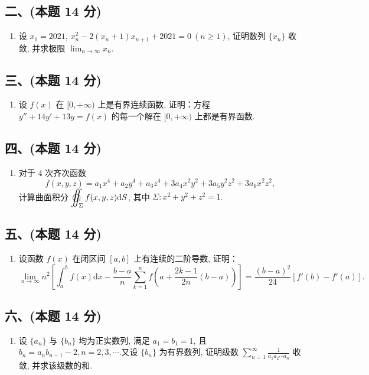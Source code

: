 \subsection*{二、(本题 14 分)}
\begin{enumerate}[start=6]
    \item 设 $x_1 = 2021$, $x_n^2 - 2(x_n + 1)x_{n+1} + 2021 = 0 \ (n \geq 1)$, 证明数列 $\{x_n\}$ 收敛, 并求极限 $ \displaystyle\lim_{n \to \infty} x_n $.
\end{enumerate}

\subsection*{三、(本题 14 分)}
\begin{enumerate}[start=7]
    \item 设 $f(x)$ 在 $[0, +\infty)$ 上是有界连续函数, 证明：方程 $y'' + 14y' + 13y = f(x)$ 的每一个解在 $[0, +\infty)$ 上都是有界函数.
\end{enumerate}

\subsection*{四、(本题 14 分)}
\begin{enumerate}[start=8]
    \item 对于 4 次齐次函数
          \[ f(x, y, z) = a_1x^4 + a_2y^4 + a_3z^4 + 3a_4x^2y^2 + 3a_5y^2z^2 + 3a_6x^2z^2,  \]
          计算曲面积分 $ \displaystyle\varoiint_{\Sigma} f(x, y, z) \mathrm{d}S $, 其中 $\Sigma : x^2 + y^2 + z^2 = 1$.
\end{enumerate}

\subsection*{五、(本题 14 分)}
\begin{enumerate}[start=9]
    \item 设函数 $f(x)$ 在闭区间 $[a, b]$ 上有连续的二阶导数, 证明：
          \[ \lim_{n \to \infty} n^2 \left[ \int_a^b f(x) \mathrm{d}x - \frac{b-a}{n} \sum_{k=1}^n f\left( a + \frac{2k-1}{2n}(b-a) \right) \right] = \frac{(b-a)^2}{24} [f'(b) - f'(a)] .\]
\end{enumerate}

\subsection*{六、(本题 14 分)}
\begin{enumerate}[start=10]
    \item 设 $\{a_n\}$ 与 $\{b_n\}$ 均为正实数列, 满足 $a_1 = b_1 = 1$, 且 $b_n = a_n b_{n-1} - 2,  n = 2,  3,  \cdots$.又设 $\{b_n\}$ 为有界数列, 证明级数 $ \displaystyle\sum_{n=1}^{\infty} \frac{1}{a_1 a_2 \cdots a_n} $ 收敛, 并求该级数的和.
\end{enumerate}


